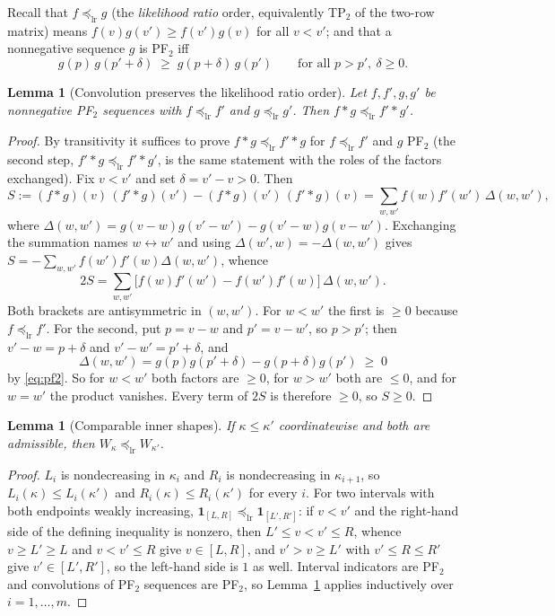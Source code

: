 \documentclass[11pt]{article}
\theoremstyle{plain}
\newtheorem{lemma}[theorem]{Lemma}
\theoremstyle{definition}
\newcommand{\lr}{\preceq_{\mathrm{lr}}}
\begin{document}
Recall that $f\lr g$ (the \emph{likelihood ratio} order, equivalently TP$_2$ of the two-row matrix)
means $f(v)g(v')\ge f(v')g(v)$ for all $v<v'$; and that a nonnegative sequence $g$ is PF$_2$ iff
\begin{equation}\label{eq:pf2}
g(p)\,g(p'+\delta)\;\ge\;g(p+\delta)\,g(p')\qquad\text{for all }p>p',\ \delta\ge0 .
\end{equation}

\begin{lemma}[Convolution preserves the likelihood ratio order]\label{lem:conv}
Let $f,f',g,g'$ be nonnegative PF$_2$ sequences with $f\lr f'$ and $g\lr g'$. Then
$f*g\lr f'*g'$.
\end{lemma}

\begin{proof}
By transitivity it suffices to prove $f*g\lr f'*g$ for $f\lr f'$ and $g$ PF$_2$ (the second step,
$f'*g\lr f'*g'$, is the same statement with the roles of the factors exchanged). Fix $v<v'$ and set
$\delta=v'-v>0$. Then
\[
S:=(f*g)(v)\,(f'*g)(v')-(f*g)(v')\,(f'*g)(v)
=\sum_{w,w'} f(w)f'(w')\,\Delta(w,w'),
\]
where $\Delta(w,w')=g(v-w)g(v'-w')-g(v'-w)g(v-w')$. Exchanging the summation names $w\leftrightarrow w'$
and using $\Delta(w',w)=-\Delta(w,w')$ gives
$S=-\sum_{w,w'}f(w')f'(w)\Delta(w,w')$, whence
\[
2S=\sum_{w,w'}\big[f(w)f'(w')-f(w')f'(w)\big]\,\Delta(w,w') .
\]
Both brackets are antisymmetric in $(w,w')$. For $w<w'$ the first is $\ge0$ because $f\lr f'$. For
the second, put $p=v-w$ and $p'=v-w'$, so $p>p'$; then $v'-w=p+\delta$ and $v'-w'=p'+\delta$, and
\[
\Delta(w,w')=g(p)g(p'+\delta)-g(p+\delta)g(p')\;\ge\;0
\]
by \eqref{eq:pf2}. So for $w<w'$ both factors are $\ge0$, for $w>w'$ both are $\le0$, and for
$w=w'$ the product vanishes. Every term of $2S$ is therefore $\ge0$, so $S\ge0$.
\end{proof}

\begin{lemma}[Comparable inner shapes]\label{lem:mlr}
If $\kappa\le\kappa'$ coordinatewise and both are admissible, then $W_\kappa\lr W_{\kappa'}$.
\end{lemma}

\begin{proof}
$L_i$ is nondecreasing in $\kappa_i$ and $R_i$ is nondecreasing in $\kappa_{i+1}$, so
$L_i(\kappa)\le L_i(\kappa')$ and $R_i(\kappa)\le R_i(\kappa')$ for every $i$. For two intervals
with both endpoints weakly increasing, $\mathbf{1}_{[L,R]}\lr\mathbf{1}_{[L',R']}$: if $v<v'$ and the
right-hand side of the defining inequality is nonzero, then $L'\le v<v'\le R$, whence $v\ge L'\ge L$
and $v<v'\le R$ give $v\in[L,R]$, and $v'>v\ge L'$ with $v'\le R\le R'$ give $v'\in[L',R']$, so the
left-hand side is $1$ as well. Interval indicators are PF$_2$ and convolutions of PF$_2$ sequences
are PF$_2$, so Lemma~\ref{lem:conv} applies inductively over $i=1,\dots,m$.
\end{proof}
\end{document}
